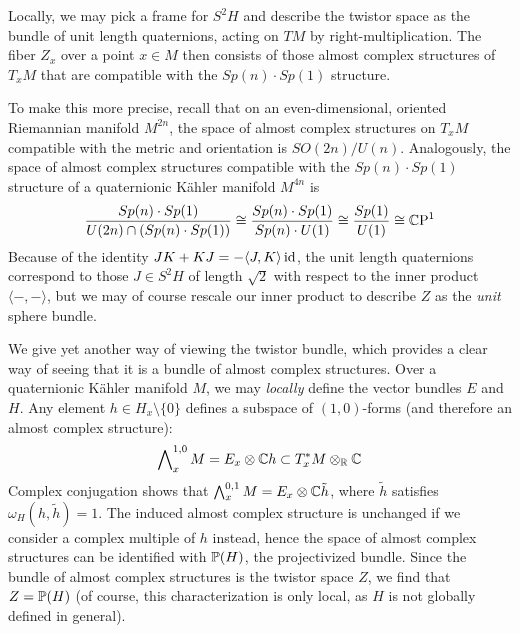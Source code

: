 \begin{rem}
	Locally, we may pick a frame for $S^2H$ and describe the twistor space as the bundle of unit length quaternions, acting on $TM$ by right-multiplication. The fiber $Z_x$ over a point $x\in M$ then consists of those almost complex structures of $T_xM$ that are compatible with the $Sp(n)\cdot Sp(1)$ structure. 
	
	To make this more precise, recall that on an even-dimensional, oriented Riemannian manifold $M^{2n}$, the space of almost complex structures on $T_xM$ compatible with the metric and orientation is $SO(2n)/U(n)$. Analogously, the space of almost complex structures compatible with the $Sp(n)\cdot Sp(1)$ structure of a quaternionic K\"ahler manifold $M^{4n}$ is
	\begin{equation*}
		\frac{Sp(n)\cdot Sp(1)}{U(2n)\cap (Sp(n)\cdot Sp(1))}\cong 
		\frac{Sp(n)\cdot Sp(1)}{Sp(n)\cdot U(1)}\cong \frac{Sp(1)}{U(1)}\cong \CP^1
	\end{equation*}
	Because of the identity $JK+KJ=-\langle J,K\rangle \id$, the unit length quaternions correspond to those $J\in S^2H$ of length $\sqrt 2$ with respect to the inner product $\langle-,-\rangle$, but we may of course rescale our inner product to describe $Z$ as the \emph{unit} sphere bundle. 
\end{rem}

We give yet another way of viewing the twistor bundle, which provides a clear way of seeing that it is a bundle of almost complex structures. Over a quaternionic K\"ahler manifold $M$, we may \emph{locally} define the vector bundles $E$ and $H$. Any element $h\in H_x\setminus \{0\}$ defines a subspace of $(1,0)$-forms (and therefore an almost complex structure):
\begin{equation*}
	\bigwedge\nolimits^{1,0}_xM=E_x\otimes \C h\subset T_x^*M\otimes_\R\C 
\end{equation*}
Complex conjugation shows that $\bigwedge^{0,1}_x M=E_x\otimes \C\tilde h$, where $\tilde h$ satisfies $\omega_H(h,\tilde h)=1$. The induced almost complex structure is unchanged if we consider a complex multiple of $h$ instead, hence the space of almost complex structures can be identified with $\P(H)$, the projectivized bundle. Since the bundle of almost complex structures is the twistor space $Z$, we find that $Z=\P(H)$ (of course, this characterization is only local, as $H$ is not globally defined in general). 

